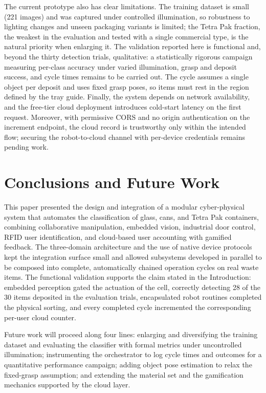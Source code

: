 ﻿\documentclass[conference]{IEEEtran}
\begin{document}
The current prototype also has clear limitations. The training dataset is small (221 images) and was captured under controlled illumination, so robustness to lighting changes and unseen packaging variants is limited; the Tetra Pak fraction, the weakest in the evaluation and tested with a single commercial type, is the natural priority when enlarging it. The validation reported here is functional and, beyond the thirty detection trials, qualitative: a statistically rigorous campaign measuring per-class accuracy under varied illumination, grasp and deposit success, and cycle times remains to be carried out. The cycle assumes a single object per deposit and uses fixed grasp poses, so items must rest in the region defined by the tray guide. Finally, the system depends on network availability, and the free-tier cloud deployment introduces cold-start latency on the first request. Moreover, with permissive CORS and no origin authentication on the increment endpoint, the cloud record is trustworthy only within the intended flow; securing the robot-to-cloud channel with per-device credentials remains pending work.

\section{Conclusions and Future Work}
This paper presented the design and integration of a modular cyber-physical system that automates the classification of glass, cans, and Tetra Pak containers, combining collaborative manipulation, embedded vision, industrial door control, RFID user identification, and cloud-based user accounting with gamified feedback. The three-domain architecture and the use of native device protocols kept the integration surface small and allowed subsystems developed in parallel to be composed into complete, automatically chained operation cycles on real waste items. The functional validation supports the claim stated in the Introduction: embedded perception gated the actuation of the cell, correctly detecting 28 of the 30 items deposited in the evaluation trials, encapsulated robot routines completed the physical sorting, and every completed cycle incremented the corresponding per-user cloud counter.

Future work will proceed along four lines: enlarging and diversifying the training dataset and evaluating the classifier with formal metrics under uncontrolled illumination; instrumenting the orchestrator to log cycle times and outcomes for a quantitative performance campaign; adding object pose estimation to relax the fixed-grasp assumption; and extending the material set and the gamification mechanics supported by the cloud layer.
\end{document}
